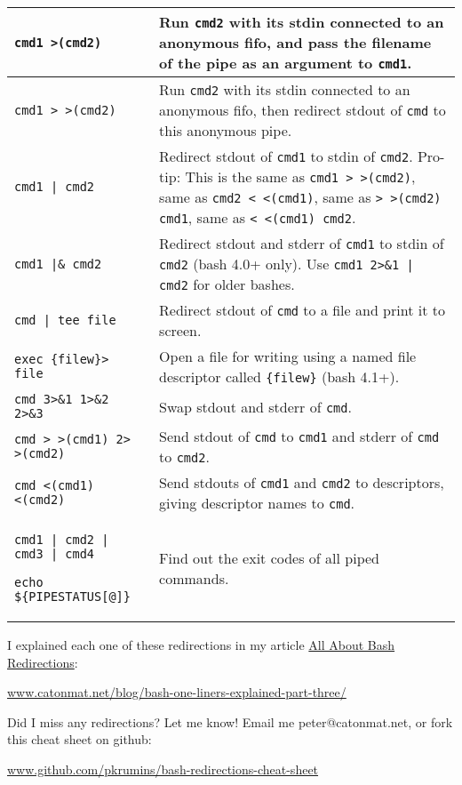 \documentclass[9pt]{memoir}
\begin{document}
\begin{tabular}{|m{5.5cm}|m{12.2cm}|}
\hline
\verb/cmd1 >(cmd2)/ & Run \verb|cmd2| with its stdin connected to an anonymous fifo, and pass the filename of the pipe as an argument to \verb|cmd1|. \\
\hline
\verb/cmd1 > >(cmd2)/ & Run \verb|cmd2| with its stdin connected to an anonymous fifo, then redirect stdout of \verb|cmd| to this anonymous pipe. \\
\hline
\verb/cmd1 | cmd2/ & Redirect stdout of \verb|cmd1| to stdin of \verb|cmd2|. Pro-tip: This is the same as \verb|cmd1 > >(cmd2)|, same as \verb|cmd2 < <(cmd1)|, same as \verb|> >(cmd2) cmd1|, same as \verb|< <(cmd1) cmd2|. \\
\hline
\verb/cmd1 |& cmd2/ & Redirect stdout and stderr of \verb|cmd1| to stdin of \verb|cmd2| (bash 4.0+ only). Use \verb/cmd1 2>&1 | cmd2/ for older bashes. \\
\hline
\verb/cmd | tee file/ & Redirect stdout of \verb|cmd| to a file and print it to screen. \\
\hline
\verb|exec {filew}> file| & Open a file for writing using a named file descriptor called \verb|{filew}| (bash 4.1+). \\
\hline
\verb|cmd 3>&1 1>&2 2>&3| & Swap stdout and stderr of \verb|cmd|. \\
\hline
\verb|cmd > >(cmd1) 2> >(cmd2)| & Send stdout of \verb|cmd| to \verb|cmd1| and stderr of \verb|cmd| to \verb|cmd2|. \\
\hline
\verb|cmd <(cmd1) <(cmd2)| & Send stdouts of \verb|cmd1| and \verb|cmd2| to descriptors, giving descriptor names to \verb|cmd|. \\
\hline
\verb/cmd1 | cmd2 | cmd3 | cmd4/ \par
\verb/echo ${PIPESTATUS[@]}/ & Find out the exit codes of all piped commands. \\
\hline
\end{tabular}

\vfill

I explained each one of these redirections in my article \href{http://www.catonmat.net/blog/bash-one-liners-explained-part-three/}{All About Bash Redirections}: \par
\href{http://www.catonmat.net/blog/bash-one-liners-explained-part-three/}{www.catonmat.net/blog/bash-one-liners-explained-part-three/}

\vfill

Did I miss any redirections? Let me know! Email me peter@catonmat.net, or fork this cheat sheet on github: \par \href{http://github.com/pkrumins/bash-redirections-cheat-sheet}{www.github.com/pkrumins/bash-redirections-cheat-sheet}

\vfill

\end{document}
